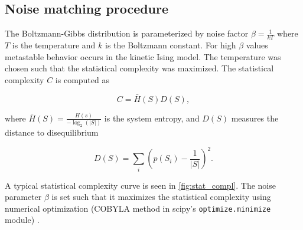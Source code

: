 \documentclass[a4paper, 11pt, twocolumn]{article}
\begin{document}
\subsection{Noise matching procedure}
\label{sec:org11ee4e3}
The Boltzmann-Gibbs  distribution is parameterized  by noise
factor $\beta =  \frac{1}{kT}$ where $T$ is  the temperature and
$k$  is   the  Boltzmann  constant.  For   high  $\beta$  values
metastable behavior  occurs in the kinetic  Ising model. The
temperature was chosen such  that the statistical complexity
\cite{Lopez-Ruiz1995a}   was    maximized.   The   statistical
complexity $C$ is computed as

\begin{equation}
C = \bar H(S) D(S),
\end{equation}

where $\bar H(S) = \frac{H(s)}{-\log_2(|S|)}$ is the system  entropy, and $D(S)$ measures the
distance to disequilibrium

\begin{equation}
D(S) = \sum_i (p(S_i) - \frac{1}{|S|})^2.
\end{equation}

A   typical  statistical   complexity  curve   is  seen   in
\cref{fig:stat_compl}. The noise parameter $\beta$ is set such that
it  maximizes  the  statistical complexity  using  numerical
optimization (COBYLA method in scipy's \texttt{optimize.minimize}
module) \cite{Virtanen2020}.
\end{document}

